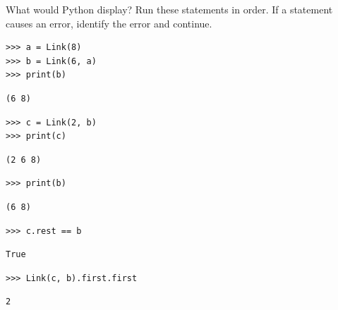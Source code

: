 \question What would Python display? Run these statements in order.
If a statement causes an error, identify the error and continue.

\begin{blocksection}
\begin{lstlisting}
>>> a = Link(8)
>>> b = Link(6, a)
>>> print(b)
\end{lstlisting}
\begin{solution}[.35in]
\begin{lstlisting}
(6 8)
\end{lstlisting}
\end{solution}
\end{blocksection}

\begin{blocksection}
\begin{lstlisting}
>>> c = Link(2, b)
>>> print(c)
\end{lstlisting}
\begin{solution}[.35in]
\begin{lstlisting}
(2 6 8)
\end{lstlisting}
\end{solution}
\end{blocksection}

\begin{blocksection}
\begin{lstlisting}
>>> print(b)
\end{lstlisting}
\begin{solution}[.35in]
\begin{lstlisting}
(6 8)
\end{lstlisting}
\end{solution}
\end{blocksection}

\begin{blocksection}
\begin{lstlisting}
>>> c.rest == b
\end{lstlisting}
\begin{solution}[.35in]
\begin{lstlisting}
True
\end{lstlisting}
\end{solution}
\end{blocksection}

\begin{blocksection}
\begin{lstlisting}
>>> Link(c, b).first.first
\end{lstlisting}
\begin{solution}[.35in]
\begin{lstlisting}
2
\end{lstlisting}
\end{solution}
\end{blocksection}

